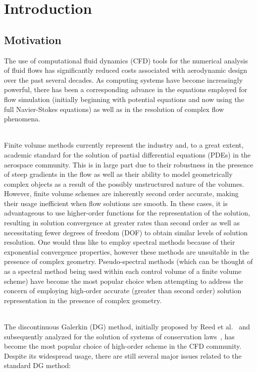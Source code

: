 \documentclass[12pt,Bold,letterpaper,TexShade]{mcgilletdclass}
\numberwithin{equation}{section}
\begin{document}
 
\chapter{Introduction}
\section{Motivation}

The use of computational fluid dynamics (CFD) tools for the numerical analysis of fluid flows has significantly reduced costs associated with aerodynamic design over the past several decades. As computing systems have become increasingly powerful, there has been a corresponding advance in the equations employed for flow simulation (initially beginning with potential equations and now using the full Navier-Stokes equations) as well as in the resolution of complex flow phenomena.
\\~

Finite volume methods currently represent the industry and, to a great extent, academic standard for the solution of partial differential equations (PDEs) in the aerospace community. This is in large part due to their robustness in the presence of steep gradients in the flow as well as their ability to model geometrically complex objects as a result of the possibly unstructured nature of the volumes. However, finite volume schemes are inherently second order accurate, making their usage inefficient when flow solutions are smooth. In these cases, it is advantageous to use higher-order functions for the representation of the solution, resulting in solution convergence at greater rates than second order as well as necessitating fewer degrees of freedom (DOF) to obtain similar levels of solution resolution. One would thus like to employ spectral methods because of their exponential convergence properties, however these methods are unsuitable in the presence of complex geometry. Pseudo-spectral methods (which can be thought of as a spectral method being used within each control volume of a finite volume scheme) have become the most popular choice when attempting to address the concern of employing high-order accurate (greater than second order) solution representation in the presence of complex geometry. 
\\~

The discontinuous Galerkin (DG) method, initially proposed by Reed et al.~\cite{reed1973} and subsequently analyzed for the solution of systems of conservation laws~\cite{cockburn1991,cockburn1989a,cockburn1989b,cockburn1990,cockburn1998}, has become the most popular choice of high-order scheme in the CFD community.  Despite its widespread usage, there are still several major issues related to the standard DG method:
\end{document}
